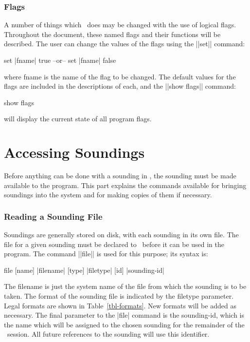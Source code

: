 \section{Flags}
A number of things which \suds\ does may be changed with the use of logical
flags.  Throughout the document, these named flags and their functions will
be described.  The user can change the values of the flags using the ||set||
command:
\begin{example}
	set |fname| true
	  {\rm --or--}
	set |fname| false
\end{example}
where {\pf fname} is the name of the flag to be changed.
The default values for the flags are included in the descriptions of each,
and the ||show flags|| command:
\begin{example}
	show flags
\end{example}
will display the current state of all program flags.


\part {Accessing Soundings}
Before anything can be done with a sounding in \suds, the sounding must
be made available to the program.  
This part explains the commands available for bringing soundings into the
system and for making copies of them if necessary.

\section {Reading a Sounding File}
Soundings are generally stored on disk, with each sounding in its own file.
The file for a given sounding must be declared to \suds\ before it can be used
in the program.  The command ||file|| is used for this purpose; its
syntax is:
\begin{example}
	file [name] |filename| [type] |filetype| [id] |sounding-id|
\end{example}
The {\pf filename} is just the system name of the file from which the sounding
is to be taken.  The 
format of the sounding file is indicated by the {\pf filetype} parameter.  
Legal formats are shown in Table~\ref{tbl-formats}.  New formats will be added
as necessary.  The final parameter to the |file| command 
is the  
{\pf sounding-id}, which is the 
name which will be assigned to the chosen sounding for the remainder of the 
\suds\ session.  All future references to the sounding will use this 
identifier.

